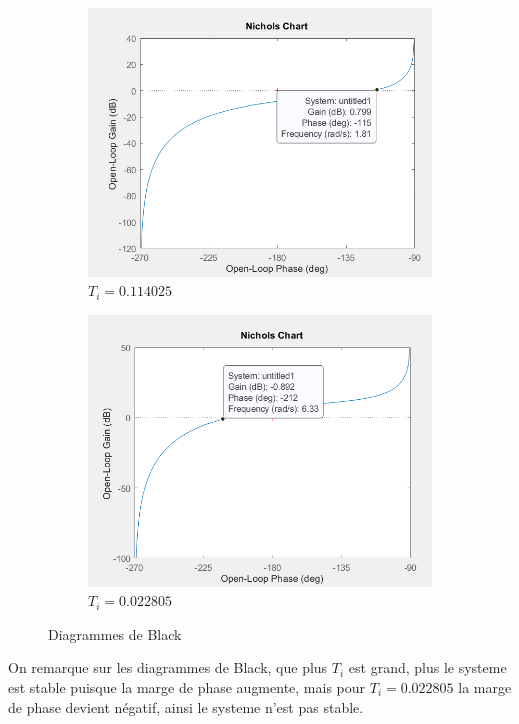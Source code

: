 \documentclass[12pt, a4paper]{report}
\begin{document}
\begin{figure}[H]
\begin{subfigure}[h!]{0.4\linewidth}
        \includegraphics[width=\linewidth]{sim2ti3diag.png}
        \caption{$T_i = 0.114025$}
    \end{subfigure}
    \hfill    
    \begin{subfigure}[h!]{0.4\linewidth}
        \includegraphics[width=\linewidth]{sim2ti4diag.png}
        \caption{$T_i = 0.022805$}
    \end{subfigure}
    \caption{Diagrammes de Black}
    \label{fig:sim2Tiblacks}
\end{figure}

On remarque sur les diagrammes de Black, que plus $T_i$ est grand, plus le systeme est stable puisque la marge de phase augmente,
mais pour $T_i = 0.022805$ la marge de phase devient négatif, ainsi le systeme n'est pas stable.
\end{document}

